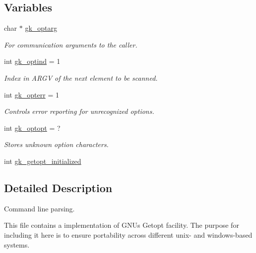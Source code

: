 \subsection*{Variables}
\begin{DoxyCompactItemize}
\item 
char $\ast$ \hyperlink{a00038_a7e251e946564d7de41aa8f602b94e74e}{gk\+\_\+optarg}
\begin{DoxyCompactList}\small\item\em For communication arguments to the caller. \end{DoxyCompactList}\item 
int \hyperlink{a00038_ab70fc0e7e22192b687bd0d377bf61e32}{gk\+\_\+optind} = 1
\begin{DoxyCompactList}\small\item\em Index in A\+R\+GV of the next element to be scanned. \end{DoxyCompactList}\item 
int \hyperlink{a00038_abf798c082a4ebebbd9482c931c109541}{gk\+\_\+opterr} = 1
\begin{DoxyCompactList}\small\item\em Controls error reporting for unrecognized options. \end{DoxyCompactList}\item 
int \hyperlink{a00038_ac77d8583b792a19e5afae69bb702a23a}{gk\+\_\+optopt} = \textquotesingle{}?\textquotesingle{}
\begin{DoxyCompactList}\small\item\em Stores unknown option characters. \end{DoxyCompactList}\item 
int \hyperlink{a00038_a71cb36f19824a1b843b9f1e067337d52}{gk\+\_\+getopt\+\_\+initialized}
\end{DoxyCompactItemize}


\subsection{Detailed Description}
Command line parsing. 

This file contains a implementation of G\+NU\textquotesingle{}s Getopt facility. The purpose for including it here is to ensure portability across different unix-\/ and windows-\/based systems.

